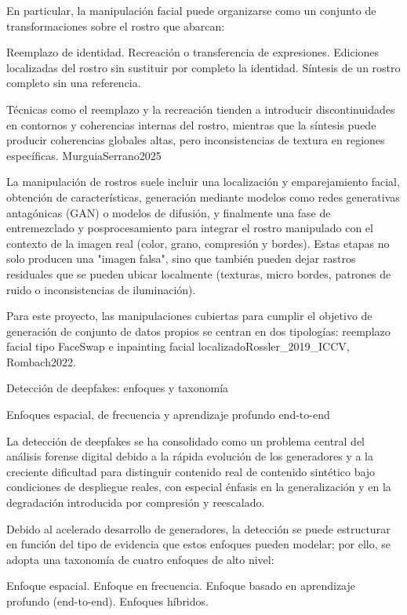 En particular, la manipulación facial puede organizarse como un conjunto de transformaciones sobre el rostro que abarcan:

 Reemplazo de identidad.
 Recreación o transferencia de expresiones.
 Ediciones localizadas del rostro sin sustituir por completo la identidad.
 Síntesis de un rostro completo sin una referencia. 


Técnicas como el reemplazo y la recreación tienden a introducir discontinuidades en contornos y coherencias internas del rostro, mientras que la síntesis puede producir coherencias globales altas, pero inconsistencias de textura en regiones específicas. MurguiaSerrano2025


La manipulación de rostros suele incluir una localización y emparejamiento facial, obtención de características, generación mediante modelos como redes generativas antagónicas (GAN) o modelos de difusión, y finalmente una fase de entremezclado y posprocesamiento para integrar el rostro manipulado con el contexto de la imagen real (color, grano, compresión y bordes). Estas etapas no solo producen una "imagen falsa", sino que también pueden dejar rastros residuales que se pueden ubicar localmente (texturas, micro bordes, patrones de ruido o inconsistencias de iluminación).

Para este proyecto, las manipulaciones cubiertas para cumplir el objetivo de generación de conjunto de datos propios se centran en dos tipologías: reemplazo facial tipo FaceSwap e inpainting facial localizadoRossler_2019_ICCV, Rombach2022.

Detección de deepfakes: enfoques y taxonomía

Enfoques espacial, de frecuencia y aprendizaje profundo end-to-end


La detección de deepfakes se ha consolidado como un problema central del análisis forense digital debido a la rápida evolución de los generadores y a la creciente dificultad para distinguir contenido real de contenido sintético bajo condiciones de despliegue reales, con especial énfasis en la generalización y en la degradación introducida por compresión y reescalado.

Debido al acelerado desarrollo de generadores, la detección se puede estructurar en función del tipo de evidencia que estos enfoques pueden modelar; por ello, se adopta una taxonomía de cuatro enfoques de alto nivel:

 Enfoque espacial.
 Enfoque en frecuencia.
 Enfoque basado en aprendizaje profundo (end-to-end).
 Enfoques híbridos. 

